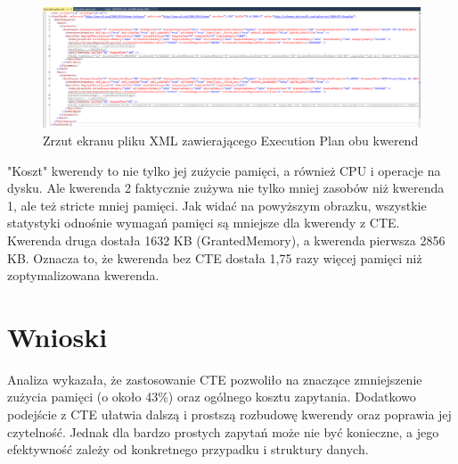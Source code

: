 \documentclass[a4paper,12pt]{article}
\begin{document}
\begin{figure}[H]
  \centering
  \includegraphics[width=1.0\textwidth]{images/memory_combined.png}
  \caption{Zrzut ekranu pliku XML zawierającego Execution Plan obu kwerend}
\end{figure}

"Koszt" kwerendy to nie tylko jej zużycie pamięci, a również CPU i operacje na dysku. Ale kwerenda 2 faktycznie zużywa nie tylko mniej zasobów niż kwerenda 1, ale też stricte mniej pamięci. Jak widać na powyższym obrazku, wszystkie statystyki odnośnie wymagań pamięci są mniejsze dla kwerendy z CTE. Kwerenda druga dostała 1632 KB (GrantedMemory), a kwerenda pierwsza 2856 KB. Oznacza to, że kwerenda bez CTE dostała 1,75 razy więcej pamięci niż zoptymalizowana kwerenda.

\section{Wnioski}

Analiza wykazała, że zastosowanie CTE pozwoliło na znaczące zmniejszenie zużycia pamięci (o około 43\%) oraz ogólnego kosztu zapytania. Dodatkowo podejście z CTE ułatwia dalszą i prostszą rozbudowę kwerendy oraz poprawia jej czytelność. Jednak dla bardzo prostych zapytań może nie być konieczne, a jego efektywność zależy od konkretnego przypadku i struktury danych.
\end{document}
